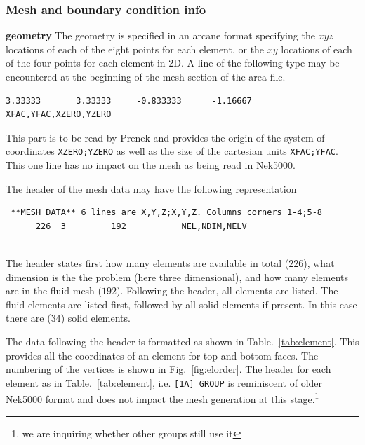 \subsubsection*{Mesh and boundary condition info} 
\begin{description}
\item{\bf geometry} The geometry is specified in an arcane format specifying
    the \(xyz\) locations of each of the eight points for each element,
    or the \(xy\) locations of each of the four points for each element in 2D.
A line of the following type may be encountered at the beginning of the mesh section of the area file.    
\begin{verbatim}
3.33333       3.33333     -0.833333      -1.16667     XFAC,YFAC,XZERO,YZERO
\end{verbatim}
This part is to be read by Prenek and provides the origin of the system of coordinates \texttt{XZERO;YZERO} as well as the size of the cartesian units \texttt{XFAC;YFAC}. This one line has no impact on the mesh as being read in Nek5000. 

The header of the mesh data may have the following representation
\begin{center}
\begin{verbatim} **MESH DATA** 6 lines are X,Y,Z;X,Y,Z. Columns corners 1-4;5-8
      226  3         192           NEL,NDIM,NELV
    
\end{verbatim}
\end{center}
The header states first how many elements are available in total (\(226\)), what dimension is the the problem (here three dimensional), and how many elements are in the fluid mesh (\(192\)). 
Following the header, all elements are listed. The fluid elements are listed first, followed by all solid elements if present. In this case there are (\(34\)) solid elements.

The data following the header is formatted as shown in Table.~\ref{tab:element}. This provides all the coordinates of an element for top and bottom faces. The numbering of the vertices is shown in Fig.~\ref{fig:elorder}. The header for each element as in Table.~\ref{tab:element}, i.e. \texttt{[1A] GROUP} is reminiscent of older Nek5000 format and does not impact the mesh generation at this stage.\footnote{we are inquiring whether other groups still use it}



\end{description}
